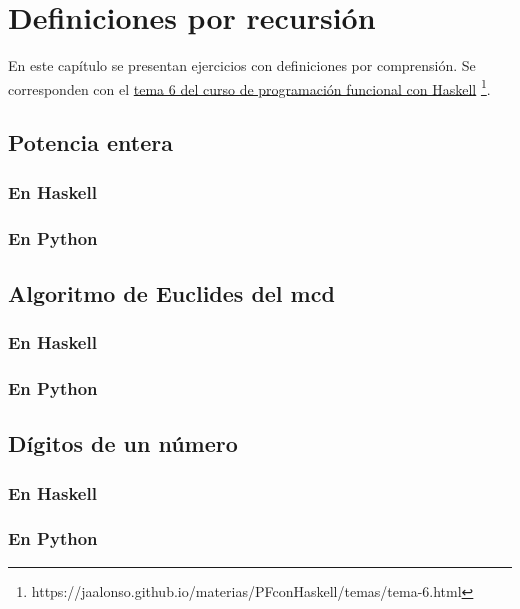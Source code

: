 \documentclass[a4paper,12pt,twoside]{book}
\begin{document}
\chapter{Definiciones por recursión}

En este capítulo se presentan ejercicios con definiciones por
comprensión. Se corresponden con el
\href{https://jaalonso.github.io/materias/PFconHaskell/temas/tema-6.html}
{tema 6 del curso de programación funcional con Haskell}
\footnote{https://jaalonso.github.io/materias/PFconHaskell/temas/tema-6.html}.

\minitoc

\section{Potencia entera}
\subsection*{En Haskell}
\subsection*{En Python}

\section{Algoritmo de Euclides del mcd}
\subsection*{En Haskell}
\subsection*{En Python}

\section{Dígitos de un número}
\subsection*{En Haskell}
\subsection*{En Python}
\end{document}
